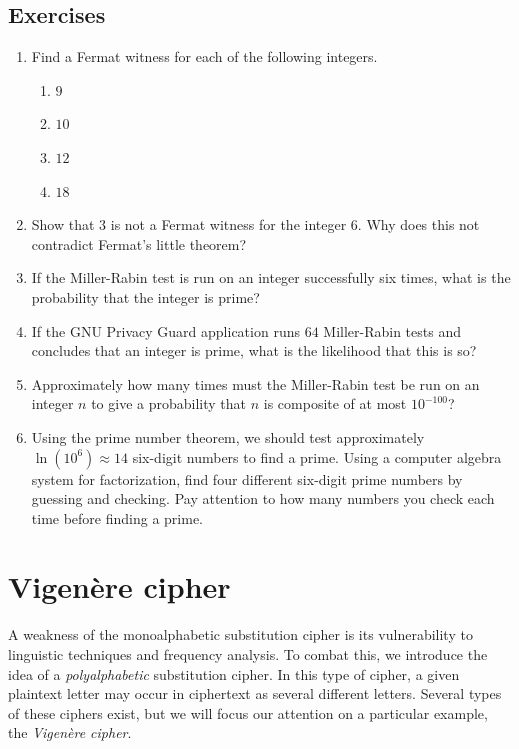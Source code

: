 \documentclass{book}
\theoremstyle{plain}
\theoremstyle{definition}
\newif\ifprintsolutions
\newcommand{\solution}[1]{\ifprintsolutions \begin{sloppypar}{\it #1}\end{sloppypar} \fi} %
\renewcommand{\mod}{\operatorname{mod}}
\renewcommand{\mod}{\operatorname{mod}}
\begin{document}
\section{Exercises}
\begin{enumerate}
\item Find a Fermat witness for each of the following integers.
\begin{enumerate}
\item $9$ \solution{$2^9 = 512 \equiv 8 \mod 9$}
\item $10$ \solution{$2^{10} = 1024 \equiv 4 \mod 10$}
\item $12$ \solution{$2^{12} = 4096 \equiv 4 \mod 12$}
\item $18$ \solution{$2^{18} = 262144 \equiv 10 \mod 18$}
\end{enumerate}
\item Show that $3$ is not a Fermat witness for the integer $6$. Why does this not contradict Fermat's little theorem? \solution{$3^6 =729 \equiv 3 \mod 6$}
\item If the Miller-Rabin test is run on an integer successfully six times, what is the probability that the integer is prime? \solution{The probability is $1-(0.25)^6 \approx 1-0.000244 = 0.999756 = 99.9756\%$ that the integer is prime.}
\item If the GNU Privacy Guard application runs $64$ Miller-Rabin tests and concludes that an integer is prime, what is the likelihood that this is so? \solution{The integer is likely prime with probability $99.999\ldots\%$ (where there are $36$ $9$s after the decimal point)!}
\item Approximately how many times must the Miller-Rabin test be run on an integer $n$ to give a probability that $n$ is composite of at most $10^{-100}$? \solution{Approximately $\log(10^{-100})/\log(0.25) \approx 166$ times.}
\item Using the prime number theorem, we should test approximately $\ln(10^6) \approx 14$ six-digit numbers to find a prime. Using a computer algebra system for factorization, find four different six-digit prime numbers by guessing and checking. Pay attention to how many numbers you check each time before finding a prime.
\end{enumerate}

\chapter{Vigen\`{e}re cipher}
A weakness of the monoalphabetic substitution cipher is its vulnerability to linguistic techniques and frequency analysis. To combat this, we introduce the idea of a {\it polyalphabetic} substitution cipher. In this type of cipher, a given plaintext letter may occur in ciphertext as several different letters. Several types of these ciphers exist, but we will focus our attention on a particular example, the {\it Vigen\`{e}re cipher}.
\end{document}
